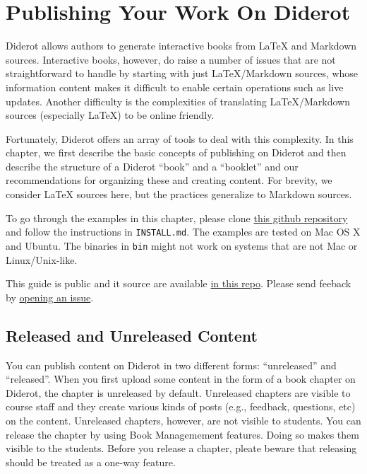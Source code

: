\chapter{Publishing Your Work On Diderot}
\label{ch:publish}

\begin{gram}
Diderot allows authors to generate interactive books from LaTeX and Markdown sources.
%
Interactive books, however, do raise a number of issues that are not straightforward to handle by starting with just LaTeX/Markdown sources, whose information content makes it difficult to enable certain operations such as live updates.
%
Another difficulty is the complexities of translating LaTeX/Markdown sources (especially LaTeX) to be online friendly.

%
Fortunately, Diderot offers an array of tools to deal with this complexity.
%
In this chapter, we first describe the basic concepts of publishing on
Diderot and then describe the structure of a Diderot ``book'' and a ``booklet'' and our recommendations for organizing these and creating content.
%
For brevity, we consider LaTeX sources here, but the practices generalize to Markdown sources.
\end{gram}

\begin{important}
To go through the examples in this chapter, please clone 
%
\href{https://github.com/diderot-edu/diderot-guide}{this github repository}
%
and follow the instructions in \lstinline`INSTALL.md`. 
%
The examples are tested on Mac OS X and Ubuntu.  The binaries in \lstinline`bin` might not work on systems that are not Mac or Linux/Unix-like. 

This guide is public and it source are available 
\href{https://github.com/diderot-edu/diderot-guide}{in this repo}.
%
Please send feeback by \href{https://github.com/diderot-edu/diderot-guide/issues}{opening an issue}.
\end{important}

\section{Released and Unreleased Content}
\label{sec:publish::released-unreleased}

You can publish content on Diderot in two different forms: ``unreleased'' and ``released''.
%
When you first upload some content in the form of a book chapter on Diderot, the chapter is unreleased by default.
%
Unreleased chapters are visible to course staff and they create various kinds of posts (e.g., feedback, questions, etc) on the content.
%
Unreleased chapters, however, are not visible to students.
%
You can release the chapter by using Book Managemement features. 
%
Doing so makes them visible to the students.
%
Before you release a chapter, pleate  beware that releasing should be treated as a one-way feature.
%

